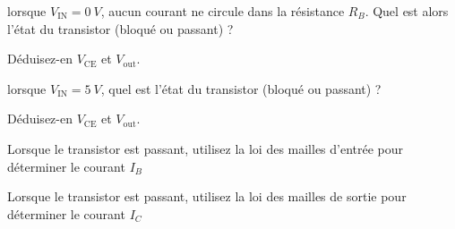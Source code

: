 \documentclass[10pt,fleqn]{article} %
\begin{document}
\pagebreak
\begin{question}
 lorsque $V_\text{IN} = \SI{0}{V}$, aucun courant ne circule dans la résistance $R_B$. Quel est alors l'état du transistor (bloqué ou passant) ?

 Déduisez-en $V_\text{CE}$ et $V_\text{out}$.
\end{question}
\begin{question}
   lorsque $V_\text{IN} = \SI{5}{V}$, quel est l'état du transistor (bloqué ou passant) ?

   Déduisez-en $V_\text{CE}$ et $V_\text{out}$.
\end{question}

\begin{question}
  Lorsque le transistor est passant, utilisez la loi des mailles d'entrée pour déterminer le courant $I_B$
\end{question}

\begin{question}
  Lorsque le transistor est passant, utilisez la loi des mailles de sortie pour déterminer le courant $I_C$
\end{question}
\end{document}
